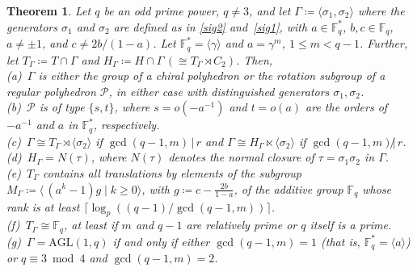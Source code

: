 \documentclass[12pt]{article}
\newtheorem{theorem}{Theorem}[section]
\theoremstyle{definition}\newtheorem{definition}{Definition}[section]
\begin{document}
\begin{theorem}
\label{gamprops}
Let $q$ be an odd prime power, $q\neq 3$, and let $\Gamma\coloneqq \langle \sigma_1,\sigma_2\rangle$ where the generators $\sigma_1$ and $\sigma_2$ are defined as in \eqref{sig2} and~\eqref{sig1}, with $a\in\mathbb{F}_q^*$, $b,c\in\mathbb{F}_q$, $a\neq \pm 1$, and $c\neq 2b/(1-a)$. Let $\mathbb{F}_q^*=\langle\gamma\rangle$ and $a=\gamma^m$, $1\leq m<q-1$. Further, let $T_\Gamma\coloneqq T\cap \Gamma$ and $H_\Gamma\coloneqq H\cap \Gamma\, (\cong T_\Gamma\rtimes C_2)$. Then, \\[.03in]
(a)\ $\Gamma$ is either the group of a chiral polyhedron or the rotation subgroup of a regular polyhedron $\mathcal{P}$, in either case with distinguished generators $\sigma_1,\sigma_2$. \\[.03in]
(b)\ $\mathcal{P}$ is of type $\{s,t\}$, where $s=o(-a^{-1})$ and $t=o(a)$ are the orders of $-a^{-1}$ and $a$ in $\mathbb{F}_q^*$, respectively. \\[.03in]
(c)\ $\Gamma \cong T_\Gamma \rtimes \langle \sigma_2 \rangle$ if $\gcd(q-1,m)\,|\,r$ and $\Gamma \cong H_\Gamma \ltimes \langle \sigma_2 \rangle$ if $\gcd(q-1,m)\!\!\not|\,r$.\\[.03in]
(d)\ $H_\Gamma = N(\tau)$, where $N(\tau)$ denotes the normal closure of $\tau=\sigma_1\sigma_2$ in $\Gamma$.
\\[.03in]
(e)\ $T_\Gamma$ contains all translations by elements of the subgroup $M_\Gamma \coloneqq  \langle\, (a^k-1)g\mid k\geq 0\rangle$, 
with $g\coloneqq c-\tfrac{2b}{1-a}$, of the additive group $\mathbb{F}_q$ whose rank is at least 
$\lceil \log_{p} ((q-1)/\gcd(q-1,m))\rceil$. \\[.03in]
(f)\ $T_{\Gamma}\cong \mathbb{F}_q$, at least if $m$ and $q-1$ are relatively prime or $q$ itself is a prime.\\[.03in]
(g)\ $\Gamma=\mathrm{AGL}(1,q)$ if and only if either $\gcd(q-1,m)=1$ (that is, $\mathbb{F}_q^*=\langle a\rangle$) or $q\equiv 3\bmod 4$ and ${\gcd(q-1,m)=2}$.
\end{theorem}
\end{document}
